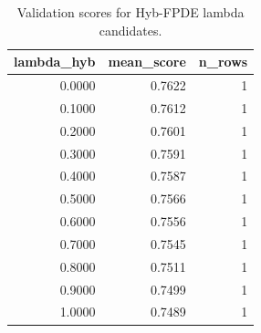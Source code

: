 \begin{table}[t]
\caption{Validation scores for Hyb-FPDE lambda candidates.}
\label{tab:lambda_distribution_computed}
\centering
\begin{tabular}{rrr}
\toprule
lambda\_hyb & mean\_score & n\_rows \\
\midrule
0.0000 & 0.7622 & 1 \\
0.1000 & 0.7612 & 1 \\
0.2000 & 0.7601 & 1 \\
0.3000 & 0.7591 & 1 \\
0.4000 & 0.7587 & 1 \\
0.5000 & 0.7566 & 1 \\
0.6000 & 0.7556 & 1 \\
0.7000 & 0.7545 & 1 \\
0.8000 & 0.7511 & 1 \\
0.9000 & 0.7499 & 1 \\
1.0000 & 0.7489 & 1 \\
\bottomrule
\end{tabular}

\end{table}
